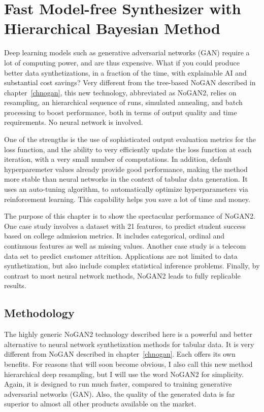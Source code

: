 \documentclass[oneside,10pt]{book}
\begin{document}
\chapter{Fast Model-free Synthesizer with Hierarchical Bayesian Method}\label{chnogan2}

Deep learning models such as generative adversarial networks (GAN) require a lot of computing power, and are thus expensive. What if you could
 produce better data synthetizations, in a fraction of the time, with explainable AI and substantial cost savings?
 Very different from the tree-based NoGAN described in chapter~\ref{chnogan}, this new technology, abbreviated as NoGAN2, relies on resampling, an hierarchical sequence of runs, simulated annealing, and batch processing to boost
 performance, both in terms of output quality and time requirements. No neural network is involved.

One of the strengths is the use of
 sophisticated output evaluation metrics for the loss function, and the ability to very efficiently update the loss function at each iteration, with a very small number of computations. In addition, default hyperparemeter values already provide good performance, making the method more stable
 than neural networks in the context of tabular data generation. It uses an auto-tuning algorithm,
 to automatically optimize hyperparameters via reinforcement learning. This capability helps you save a lot of time and money.

The purpose of this chapter is to show the spectacular performance of NoGAN2. One case study involves a dataset with 21 features, to predict student success based on college admission metrics. It includes categorical, ordinal and continuous features as well as missing values. Another case study is a telecom data set to predict customer attrition. Applications are not limited
 to data synthetization, but also include complex statistical inference problems. Finally, by contrast to most neural network methods, NoGAN2 leads to fully replicable results.

\section{Methodology}



The highly generic NoGAN2 technology described here is a powerful and better alternative to neural network synthetization methods for tabular data. It is very different from NoGAN described in chapter~\ref{chnogan}. Each offers its own benefits.
For reasons that will soon become obvious, I also call this new method \textcolor{index}{hierarchical deep resampling}, but I will use the word NoGAN2 for simplicity.
Again, it is designed to run much faster, compared to
 training \textcolor{index}{generative adversarial networks} (GAN). Also, the quality of the generated data is far superior to almost all other products available on the market.
\end{document}
